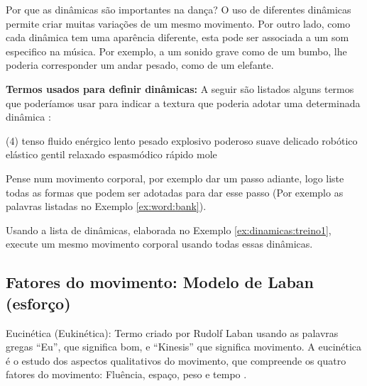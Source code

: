 \begin{tcbinformation}{Por que as dinâmicas são importantes na dança?}
\label{ref:importanciadinamicas}
O uso de diferentes dinâmicas permite criar muitas variações de um mesmo movimento.
Por outro lado, como cada dinâmica tem uma aparência diferente,
esta pode ser associada a um som especifico na música.
Por exemplo, a um sonido grave como de um bumbo,
lhe poderia corresponder um andar pesado, como de um elefante.
\end{tcbinformation} 

\begin{example}
\label{ex:word:bank}
\textbf{Termos usados para definir dinâmicas:} 
A seguir são listados alguns termos que poderíamos usar 
para indicar a textura que poderia adotar uma determinada dinâmica \cite[pp. 31]{paine2014complete}:

\begin{tasks}(4)
\task tenso
\task fluido
\task enérgico
\task lento
\task pesado
\task explosivo
\task poderoso
\task suave
\task delicado
\task robótico
\task elástico
\task gentil
\task relaxado
\task espasmódico
\task rápido
\task mole
\end{tasks}
\end{example}


\begin{example}
\label{ex:dinamicas:treino1}
Pense num movimento corporal, por exemplo dar um passo adiante,
logo liste todas as formas que podem ser adotadas para dar esse passo (Por 
exemplo as palavras listadas no Exemplo \ref{ex:word:bank}). 
\end{example}

\begin{example}
\label{ex:dinamicas:treino2}
Usando a lista de dinâmicas, elaborada no Exemplo \ref{ex:dinamicas:treino1},
execute um mesmo movimento corporal usando  todas essas dinâmicas.
\end{example}


\subsection{Fatores do movimento: Modelo de Laban (esforço)}
\label{subsec:fatordinamica}

\begin{tcbinformation}{Eucinética (Eukinética):}
\label{ref:eukinetic}
Termo criado por Rudolf Laban usando as palavras gregas ``Eu'', que significa bom,
e ``Kinesis'' que significa movimento.
A eucinética é o estudo dos aspectos qualitativos do movimento,
que compreende os quatro fatores do movimento: Fluência,  espaço,  peso  e  tempo 
\cite[pp. 25-26]{elementosdanca2017} \cite[pp. 97]{maletic2011body}.
\end{tcbinformation} 


